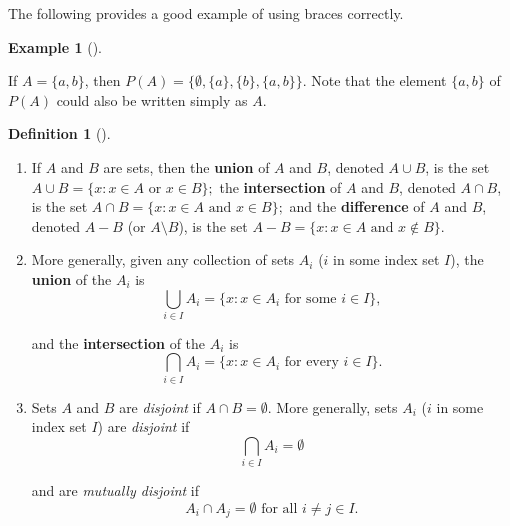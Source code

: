 \documentclass[10pt,]{book}
\newcommand{\terminology}[1]{\textbf{#1}}
\theoremstyle{plain}
\theoremstyle{definition}
\newtheorem{definition}[theorem]{Definition}
\theoremstyle{definition}
\theoremstyle{definition}
\newtheorem{example}[theorem]{Example}
\theoremstyle{definition}
\numberwithin{equation}{section}
\begin{document}
    The following provides a good example of using braces correctly.
\begin{example}[]\label{example-3}

        If \(A=\{a,b\}\), then \(P(A)=\{\emptyset, \{a\}, \{b\}, \{a,b\}\}\). Note that the element \(\{a,b\}\) of \(P(A)\) could also be written simply as \(A\).
\end{example}
\begin{definition}[{}]\label{definition-6}
\leavevmode%
\begin{enumerate}
\item\hypertarget{li-6}{}
            If \(A\) and \(B\) are sets, then the \terminology{union} of \(A\) and \(B\), denoted \(A\cup B\), is the set
            \(A\cup B=\{x: x\in A \text{ or }  x\in B\};\) the \terminology{intersection} of \(A\) and \(B\), denoted \(A\cap B\), is the set
            \(A\cap B=\{x: x\in A \text{ and }  x\in B\};\) and the \terminology{difference} of \(A\) and \(B\), denoted \(A-B\) (or \(A\setminus B\)), is the set
            \(A-B=\{x: x\in A \text{ and }  x\not\in B\}.\)
\item\hypertarget{li-7}{}
            More generally, given any collection of sets \(A_i\) (\(i\) in some index set \(I\)), the \terminology{union} of the \(A_i\) is
\begin{equation*}

              \bigcup_{i\in I}A_i=\{x: x\in A_i \text{ for some }  i\in I\},
            
\end{equation*}

            and the \terminology{intersection} of the \(A_i\) is
\begin{equation*}

              \bigcap_{i\in I}A_i=\{x: x\in A_i \text{ for every }  i\in I\}.
            
\end{equation*}

\item\hypertarget{li-8}{}
            Sets \(A\) and \(B\) are \emph{disjoint} if \(A\cap B=\emptyset\).  More generally, sets \(A_i\) (\(i\) in some index set \(I\)) are
            \emph{disjoint} if
\begin{equation*}

              \bigcap_{i\in I}A_i=\emptyset
            
\end{equation*}

            and are \emph{mutually disjoint} if
\begin{equation*}

              A_i\cap A_j=\emptyset \text{ for all } i\neq j \in I.
            
\end{equation*}

\end{enumerate}
\label{notation-17}
\label{notation-18}
\label{notation-19}
\label{notation-20}
\label{notation-21}
\end{definition}
\par
\end{document}
